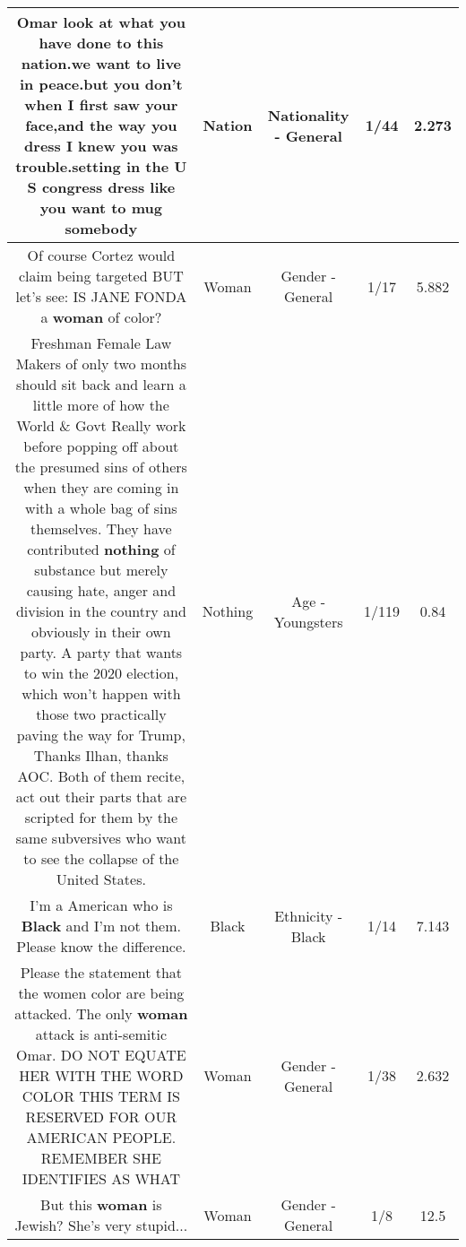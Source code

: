 \documentclass[11pt]{article}
\newlength\mylength
\begin{document}
\begin{center}
\begin{longtable}{|C{.65\mylength}|C{.30\mylength}|C{.12\mylength}|C{.12\mylength}|C{.12\mylength}|}
  \small Omar look at what you have done to this \textbf{nation}.we want to live in peace.but you don't when I first saw your face,and the way you dress I knew you was trouble.setting in the U S congress dress like you want to mug somebody\normalsize   & Nation & Nationality - General & 1/44 & 2.273 \\  \hline
  \small Of course Cortez would claim being targeted BUT let's see: IS JANE FONDA a \textbf{woman} of color?\normalsize   & Woman & Gender - General & 1/17 & 5.882 \\  \hline
  \small Freshman Female Law Makers of only two months should sit back and learn a little more of how the World \& Govt Really work before popping off about the presumed sins of others when they are coming in with a whole bag of sins themselves.  They have contributed \textbf{nothing} of substance but merely causing hate, anger and division in the country and obviously in their own party.  A party that wants to win the 2020 election, which won't happen with those two practically paving the way for Trump,  Thanks Ilhan, thanks AOC.  Both of them recite, act out their parts that are scripted for them by the same subversives who want to see the collapse of the United States.\normalsize   & Nothing & Age - Youngsters & 1/119 & 0.84 \\  \hline
  \small I'm a American who is \textbf{Black} and I'm not them. Please know the difference.\normalsize   & Black & Ethnicity - Black & 1/14 & 7.143 \\  \hline
  \small Please the statement that the women color are being attacked. The only \textbf{woman} attack is anti-semitic Omar. DO NOT EQUATE HER WITH THE WORD COLOR THIS TERM IS RESERVED FOR OUR AMERICAN PEOPLE. REMEMBER SHE IDENTIFIES AS WHAT\normalsize   & Woman & Gender - General & 1/38 & 2.632 \\  \hline
  \small But this \textbf{woman} is Jewish? She's very stupid...\normalsize   & Woman & Gender - General & 1/8 & 12.5 \\  \hline

\end{longtable}
\end{center}
\end{document}
